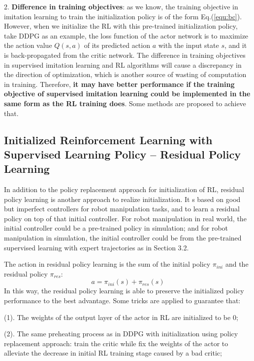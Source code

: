 \documentclass{article}
\begin{document}
2. \textbf{Difference in training objectives}: as we know, the training objective in imitation learning to train the initialization policy is of the form Eq.(\ref{equ:bc}). However, when we initialize the RL with this pre-trained initialization policy, take DDPG as an example, the loss function of the actor network is to maximize the action value $Q(s,a)$ of its predicted action $a$ with the input state $s$, and it is back-propagated from the critic network. The difference in training objectives in supervised imitation learning and RL algorithms will cause a discrepancy in the direction of optimization, which is another source of wasting of computation in training. Therefore, \textbf{it may have better performance if the training objective of supervised imitation learning could be implemented in the same form as the RL training does}. Some methods are proposed to achieve that.

\subsection{Initialized Reinforcement Learning with Supervised Learning Policy -- Residual Policy Learning}
In addition to the policy replacement approach for initialization of RL, residual policy learning \cite{johannink2018residual} is another approach to realize initialization. It s based on good but imperfect controllers for robot manipulation tasks, and to learn a residual policy on top of that initial controller. For robot manipulation in real world, the initial controller could be a pre-trained policy in simulation; and for robot manipulation in simulation, the initial controller could be from the pre-trained supervised learning with expert trajectories as in Section 3.2.

The action in residual policy learning is the sum of the initial policy $\pi_{ini}$ and the residual policy $\pi_{res}$:
\begin{equation}
a=\pi_{ini}(s)+\pi_{res}(s)
\end{equation}
In this way, the residual policy learning is able to preserve the initialized policy performance to the best advantage. Some tricks are applied to guarantee that: 

(1). The weights of the output layer of the actor in RL are initialized to be 0;
 
(2). The same preheating process as in DDPG with initialization using policy replacement approach: train the critic while fix the weights of the actor to alleviate the decrease in initial RL training stage caused by a bad critic;
\end{document}
